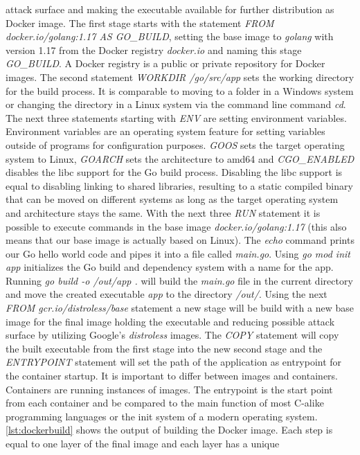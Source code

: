 \documentclass[titlepage]{report}
\begin{document}
attack surface and making the executable available for further distribution as Docker image. The first stage starts with the statement
\emph{FROM docker.io/golang:1.17 AS GO\_BUILD}, setting the base image to \emph{golang} with version 1.17 from the Docker registry \emph{docker.io}
and naming this stage \emph{GO\_BUILD}. A Docker registry is a public or private repository for Docker images. 
The second statement \emph{WORKDIR /go/src/app} sets the working directory for the build process. It is comparable to moving to a folder
in a Windows system or changing the directory in a Linux system via the command line command \emph{cd}. The next three statements starting
with \emph{ENV} are setting environment variables. Environment variables are an operating system feature for setting variables outside
of programs for configuration purposes. \emph{GOOS} sets the target operating system to Linux, \emph{GOARCH} sets the architecture to amd64
and \emph{CGO\_ENABLED} disables the libc support for the Go build process. Disabling the libc support is equal to disabling linking
to shared libraries, resulting to a static compiled binary that can be moved on different systems as long as the target operating system
and architecture stays the same. With the next three \emph{RUN} statement it is possible to execute commands in the base image
\emph{docker.io/golang:1.17} (this also means that our base image is actually based on Linux). The \emph{echo} command
prints our Go hello world code and pipes it into a file called \emph{main.go}. Using \emph{go mod init app} initializes
the Go build and dependency system with a name for the app. Running \emph{go build -o /out/app .} will build the \emph{main.go}
file in the current directory and move the created executable \emph{app} to the directory \emph{/out/}. Using the next
\emph{FROM gcr.io/distroless/base} statement a new stage will be build with a new base image for the final image holding the executable
and reducing possible attack surface by utilizing Google's \emph{distroless} images. The \emph{COPY} statement will
copy the built executable from the first stage into the new second stage and the \emph{ENTRYPOINT} statement will set
the path of the application as entrypoint for the container startup. It is important to differ between images and containers.
Containers are running instances of images. The entrypoint is the start point from each container and be compared to the main function
of most C-alike programming languages or the init system of a modern operating system. \autoref{lst:dockerbuild} shows
the output of building the Docker image. Each step is equal to one layer of the final image and each layer has a unique
\end{document}

